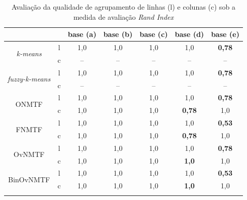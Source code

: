 \documentclass[
    12pt,                %
    oneside,            %
    a4paper,            %
    english,            %
    brazil                %
    ]{abntex2ppgsi}
\begin{document}
\begin{table}[H]
\centering
    \caption{Avaliação da qualidade de agrupamento de linhas (l) e colunas (c) sob a medida de avaliação \textit{Rand Index}}
        \begin{tabular}{ccccccc}
            \hline
            & &\textbf{base (a)} & \textbf{base (b)} & \textbf{base (c)} & \textbf{base (d) }& \textbf{base (e)} \\
            \hline
            \multirow{2}{*}{\textit{k-means}}     & l &  1,0 & 1,0 & 1,0 & 1,0 & \textbf{0,78}\\
                                                   & c &  --  & --  & --  & --  & --   \\
            \hline
            \multirow{2}{*}{\textit{fuzzy-k-means}} & l &  1,0 & 1,0 & 1,0 & 1,0 & \textbf{0,78} \\
                                                    & c &  --  & --  & --  & --  & --   \\
            \hline
            \multirow{2}{*}{ONMTF}   & l &  1,0 & 1,0 & 1,0 & 1,0 & \textbf{0,78} \\
                                     & c &  1,0 & 1,0 & 1,0 & \textbf{0,78} & 1,0 \\
            \hline
            \multirow{2}{*}{FNMTF}   & l &  1,0 & 1,0 & 1,0 & 1,0 & \textbf{0,53} \\
                                     & c &  1,0 & 1,0 & 1,0 & \textbf{0,78} & 1,0 \\
            \hline
            \multirow{2}{*}{OvNMTF}  & l &  1,0 & 1,0 & 1,0 & 1,0 & \textbf{0,78} \\
                                     & c &  1,0 & 1,0 & 1,0 & \textbf{1,0} & 1,0 \\
            \hline
            \multirow{2}{*}{BinOvNMTF} & l &  1,0 & 1,0 & 1,0 & 1,0 & \textbf{0,53} \\
                                       & c &  1,0 & 1,0 & 1,0 & \textbf{1,0} & 1,0 \\
            \hline
            & & & & & &   \\
        \end{tabular}
        \label{tab:datasetsstats_result}
\end{table}
\end{document}
